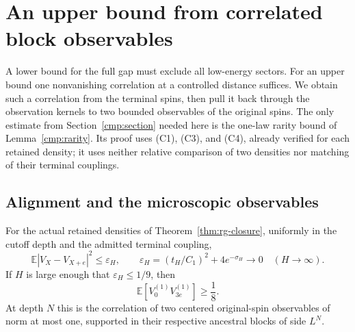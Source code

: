 \section{An upper bound from correlated block observables}
\label{sec:upper}

A lower bound for the full gap must exclude all low-energy sectors.
For an upper bound one nonvanishing correlation at a controlled
distance suffices. We obtain such a correlation from the terminal
spins, then pull it back through the observation kernels to two bounded
observables of the original spins. The only estimate from
Section~\ref{cmp:section} needed here is the one-law rarity bound of
Lemma~\ref{cmp:rarity}. Its proof uses (C1), (C3), and (C4), already
verified for each retained density; it uses neither relative comparison
of two densities nor matching of their terminal couplings.

\subsection{Alignment and the microscopic observables}

\begin{lemma}
\label{lem:alignment}
For the actual retained densities of Theorem~\ref{thm:rg-closure},
uniformly in the cutoff depth and the admitted terminal coupling,
\begin{equation}
\label{cmp:alignment}
 \mathbb E|V_X-V_{X+e}|^2\le\varepsilon_H,\qquad
 \varepsilon_H=(t_H/C_1)^2+4e^{-\sigma_H}
                         \longrightarrow0\quad(H\to\infty).
\end{equation}
If $H$ is large enough that $\varepsilon_H\le1/9$, then
\begin{equation}
\label{cmp:block-correlation}
 \mathbb E[V_0^{(1)}V_{3e}^{(1)}]\ge\frac18.
\end{equation}
At depth $N$ this is the correlation of two centered original-spin
observables of norm at most one, supported in their respective
ancestral blocks of side $L^N$.
\end{lemma}

